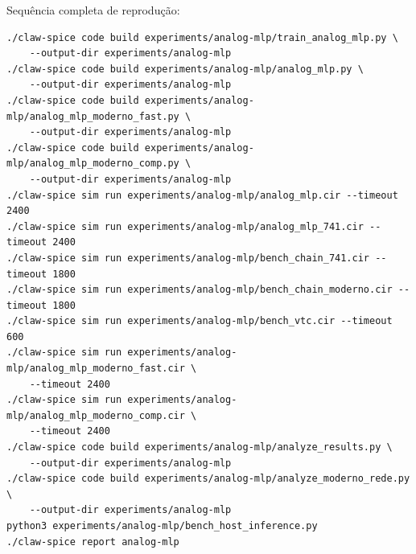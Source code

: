 Sequência completa de reprodução:

\begin{verbatim}
./claw-spice code build experiments/analog-mlp/train_analog_mlp.py \
    --output-dir experiments/analog-mlp
./claw-spice code build experiments/analog-mlp/analog_mlp.py \
    --output-dir experiments/analog-mlp
./claw-spice code build experiments/analog-mlp/analog_mlp_moderno_fast.py \
    --output-dir experiments/analog-mlp
./claw-spice code build experiments/analog-mlp/analog_mlp_moderno_comp.py \
    --output-dir experiments/analog-mlp
./claw-spice sim run experiments/analog-mlp/analog_mlp.cir --timeout 2400
./claw-spice sim run experiments/analog-mlp/analog_mlp_741.cir --timeout 2400
./claw-spice sim run experiments/analog-mlp/bench_chain_741.cir --timeout 1800
./claw-spice sim run experiments/analog-mlp/bench_chain_moderno.cir --timeout 1800
./claw-spice sim run experiments/analog-mlp/bench_vtc.cir --timeout 600
./claw-spice sim run experiments/analog-mlp/analog_mlp_moderno_fast.cir \
    --timeout 2400
./claw-spice sim run experiments/analog-mlp/analog_mlp_moderno_comp.cir \
    --timeout 2400
./claw-spice code build experiments/analog-mlp/analyze_results.py \
    --output-dir experiments/analog-mlp
./claw-spice code build experiments/analog-mlp/analyze_moderno_rede.py \
    --output-dir experiments/analog-mlp
python3 experiments/analog-mlp/bench_host_inference.py
./claw-spice report analog-mlp
\end{verbatim}
